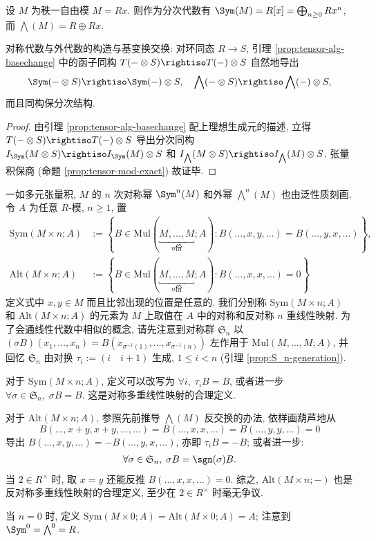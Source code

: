 \begin{example}\label{eg:Sym-wedge-rank1}
	设 $M$ 为秩一自由模 $M = Rx$. 则作为分次代数有 $\Sym(M) = R[x] = \bigoplus_{n \geq 0} R x^n$, 而 $\bigwedge(M) = R \oplus Rx$.
\end{example}

\begin{lemma}
	对称代数与外代数的构造与基变换交换: 对环同态 $R \to S$, 引理 \ref{prop:tensor-alg-basechange} 中的函子同构 $T(- \otimes S) \rightiso T(-) \otimes S$ 自然地导出
	\[ \Sym(- \otimes S) \rightiso \Sym(-) \otimes S, \quad \bigwedge(- \otimes S) \rightiso \bigwedge(-) \otimes S, \]
	而且同构保分次结构.
\end{lemma}
\begin{proof}
	由引理 \ref{prop:tensor-alg-basechange} 配上理想生成元的描述, 立得 $T(- \otimes S) \rightiso T(-) \otimes S$ 导出分次同构 $I_{\Sym}(M \otimes S) \rightiso I_{\Sym}(M) \otimes S$ 和 $I_{\bigwedge}(M \otimes S) \rightiso I_{\bigwedge}(M) \otimes S$. 张量积保商 (命题 \ref{prop:tensor-mod-exact}) 故证毕.
\end{proof}

一如多元张量积, $M$ 的 $n$ 次对称幂 $\Sym^n(M)$ 和外幂 $\bigwedge^n(M)$ 也由泛性质刻画. 令 $A$ 为任意 $R$-模, $n \geq 1$, 置
\begin{align*}
	\text{Sym}(M \times n; A) & := \left\{ B \in \text{Mul}(\underbracket{M, \ldots, M}_{n \text{份}}; A) : B(\ldots, x,y, \ldots) = B(\ldots, y,x, \ldots) \right\}, \\
	\text{Alt}(M \times n; A) & := \left\{ B \in \text{Mul}(\underbracket{M, \ldots, M}_{n \text{份}}; A) : B(\ldots, x,x, \ldots)=0 \right\}
\end{align*}
定义式中 $x,y \in M$ 而且比邻出现的位置是任意的. 我们分别称 $\text{Sym}(M \times n; A)$ 和 $\text{Alt}(M \times n; A)$ 的元素为 $M$ 上取值在 $A$ 中的对称和反对称 $n$ 重线性映射. 为了会通线性代数中相似的概念, 请先注意到对称群 $\mathfrak{S}_n$ 以 $(\sigma B)(x_1, \ldots, x_n) = B(x_{\sigma^{-1}(1)}, \ldots, x_{\sigma^{-1}(n)})$ 左作用于 $\text{Mul}(M, \ldots, M; A)$, 并回忆 $\mathfrak{S}_n$ 由对换 $\tau_i := (i \quad i+1)$ 生成, $1 \leq i < n$ (引理 \ref{prop:S_n-generation}).
\begin{compactitem}
	\item 对于 $\text{Sym}(M \times n; A)$, 定义可以改写为 $\forall i, \;\tau_i B = B$, 或者进一步 $\forall \sigma \in \mathfrak{S}_n,\; \sigma B =B$. 这是对称多重线性映射的合理定义.
	\item 对于 $\text{Alt}(M \times n; A)$, 参照先前推导 $\bigwedge(M)$ 反交换的办法, 依样画葫芦地从
	\[ B(\ldots, x+y, x+y, \ldots, \ldots) = B(\ldots, x,x, \ldots) = B(\ldots, y,y, \ldots) = 0\]
	导出 $B(\ldots, x,y, \ldots) = -B(\ldots, y,x, \ldots)$, 亦即 $\tau_i B = -B$; 或者进一步:
		\begin{gather*}
			\forall \sigma \in \mathfrak{S}_n,\; \sigma B = \sgn(\sigma)B.
		\end{gather*}
		当 $2 \in R^\times$ 时, 取 $x=y$ 还能反推 $B(\ldots, x,x, \ldots)=0$. 综之, $\text{Alt}(M \times n; -)$ 也是反对称多重线性映射的合理定义, 至少在 $2 \in R^\times$ 时毫无争议.
\end{compactitem}
当 $n=0$ 时, 定义 $\text{Sym}(M \times 0; A) = \text{Alt}(M \times 0; A) = A$; 注意到 $\Sym^0 = \bigwedge^0 = R$.

